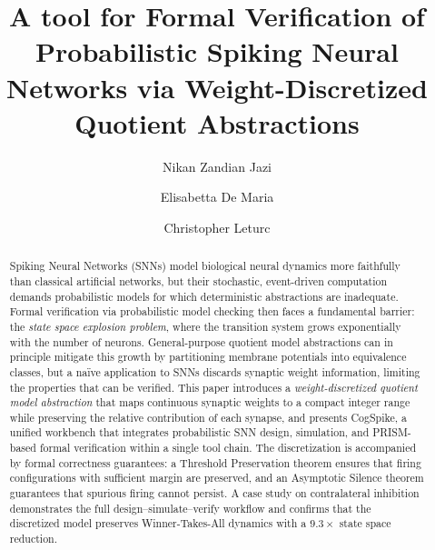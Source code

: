 \documentclass[runningheads]{llncs}
\begin{document}
\title{A tool for Formal Verification of Probabilistic Spiking Neural Networks
  via Weight-Discretized Quotient Abstractions}

\author{Nikan Zandian Jazi \and Elisabetta De Maria \and Christopher Leturc}


\maketitle

\begin{abstract}
Spiking Neural Networks (SNNs) model biological neural dynamics more
faithfully than classical artificial networks, but their stochastic,
event-driven computation demands probabilistic models for which
deterministic abstractions are inadequate. Formal verification via
probabilistic model checking then faces a fundamental barrier: the
\emph{state space explosion problem}, where the transition system grows
exponentially with the number of neurons. General-purpose quotient model
abstractions can in principle mitigate this growth by partitioning membrane
potentials into equivalence classes, but a naïve application to SNNs discards
synaptic weight information, limiting the properties that can be verified.
This paper introduces a \emph{weight-discretized quotient model abstraction}
that maps continuous synaptic weights to a compact integer range while
preserving the relative contribution of each synapse, and presents CogSpike, a
unified workbench that integrates probabilistic SNN design, simulation, and
PRISM-based formal verification within a single tool chain. The discretization
is accompanied by formal correctness guarantees: a Threshold Preservation
theorem ensures that firing configurations with sufficient margin are
preserved, and an Asymptotic Silence theorem guarantees that spurious firing
cannot persist. A case study on contralateral inhibition demonstrates the full
design--simulate--verify workflow and confirms that the discretized model
preserves Winner-Takes-All dynamics with a $9.3\times$ state space reduction.

\end{abstract}
\end{document}
